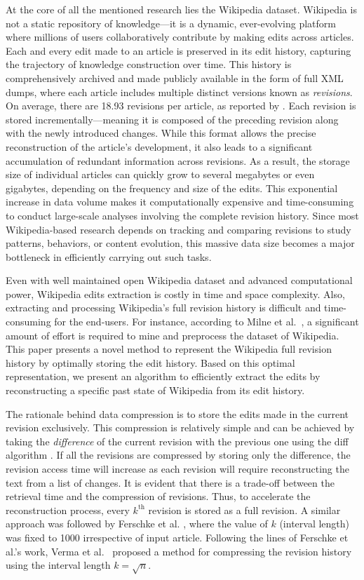 \documentclass[acmsmall]{acmart}
\begin{document}
At the core of all the mentioned research lies the Wikipedia dataset. Wikipedia is not a static repository of knowledge—it is a dynamic, ever-evolving platform where millions of users collaboratively contribute by making edits across articles. Each and every edit made to an article is preserved in its edit history, capturing the trajectory of knowledge construction over time. This history is comprehensively archived and made publicly available in the form of full XML dumps, where each article includes multiple distinct versions known as \emph{revisions}. On average, there are 18.93 revisions per article, as reported by \cite{wikirev}. Each revision is stored incrementally—meaning it is composed of the preceding revision along with the newly introduced changes. While this format allows the precise reconstruction of the article’s development, it also leads to a significant accumulation of redundant information across revisions. As a result, the storage size of individual articles can quickly grow to several megabytes or even gigabytes, depending on the frequency and size of the edits. This exponential increase in data volume makes it computationally expensive and time-consuming to conduct large-scale analyses involving the complete revision history. Since most Wikipedia-based research depends on tracking and comparing revisions to study patterns, behaviors, or content evolution, this massive data size becomes a major bottleneck in efficiently carrying out such tasks.

Even with well maintained open Wikipedia dataset and advanced computational power, Wikipedia edits extraction is costly in time and space complexity. Also, extracting and processing Wikipedia's full revision history is difficult and time-consuming for the end-users. For instance, according to Milne et al.~\cite{milne2013open}, a significant amount of effort is required to mine and preprocess the dataset of Wikipedia.
This paper presents a novel method to represent the Wikipedia full revision history by optimally storing the edit history. Based on this optimal representation, we present an algorithm to efficiently extract the edits by reconstructing a specific past state of Wikipedia from its edit history. 

The rationale behind data compression is to store the edits made in the current revision exclusively. This compression is relatively simple and can be achieved by taking the \emph{difference} of the current revision with the previous one using the diff algorithm \cite{hunt1976algorithm}.  If all the revisions are compressed by storing only the difference, the revision access time will increase as each revision will require reconstructing the text from a list of changes. It is evident that there is a trade-off between the retrieval time and the compression of revisions. Thus, to accelerate the reconstruction process, every $k^\text{th}$ revision is stored as a full revision. A similar approach was followed by Ferschke et al. \cite{ferschke2011wikipedia}, where the value of $k$ (interval length) was fixed to 1000 irrespective of input article. Following the lines of Ferschke et al.'s work, Verma et al.~\cite{verma2021open} proposed a method for compressing the revision history using the interval length $k=\sqrt{n}$. 
\end{document}
